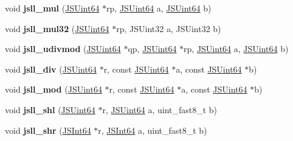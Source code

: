 \begin{DoxyCompactItemize}
\item 
\mbox{\label{group__zcl__64_ga09e45168abb5ea8e6d487514eae102c8}} 
void {\bfseries jsll\+\_\+mul} (\hyperlink{struct_j_s_int64}{J\+S\+Uint64} $\ast$rp, \hyperlink{struct_j_s_int64}{J\+S\+Uint64} a, \hyperlink{struct_j_s_int64}{J\+S\+Uint64} b)
\item 
\mbox{\label{group__zcl__64_ga0b4ed4198b603054301a4c9147e5f060}} 
void {\bfseries jsll\+\_\+mul32} (\hyperlink{struct_j_s_int64}{J\+S\+Uint64} $\ast$rp, J\+S\+Uint32 a, J\+S\+Uint32 b)
\item 
\mbox{\label{group__zcl__64_ga26cb84da9083907cc41db0edf95b1b96}} 
void {\bfseries jsll\+\_\+udivmod} (\hyperlink{struct_j_s_int64}{J\+S\+Uint64} $\ast$qp, \hyperlink{struct_j_s_int64}{J\+S\+Uint64} $\ast$rp, \hyperlink{struct_j_s_int64}{J\+S\+Uint64} a, \hyperlink{struct_j_s_int64}{J\+S\+Uint64} b)
\item 
\mbox{\label{group__zcl__64_gaf40c23a4a3872380497dae260ea58554}} 
void {\bfseries jsll\+\_\+div} (\hyperlink{struct_j_s_int64}{J\+S\+Uint64} $\ast$r, const \hyperlink{struct_j_s_int64}{J\+S\+Uint64} $\ast$a, const \hyperlink{struct_j_s_int64}{J\+S\+Uint64} $\ast$b)
\item 
\mbox{\label{group__zcl__64_gaecddfb7e3ca39fa5313632c47a47f20c}} 
void {\bfseries jsll\+\_\+mod} (\hyperlink{struct_j_s_int64}{J\+S\+Uint64} $\ast$r, const \hyperlink{struct_j_s_int64}{J\+S\+Uint64} $\ast$a, const \hyperlink{struct_j_s_int64}{J\+S\+Uint64} $\ast$b)
\item 
\mbox{\label{group__zcl__64_gadbc8463d4ec9862cbb621cdd5f7297fa}} 
void {\bfseries jsll\+\_\+shl} (\hyperlink{struct_j_s_int64}{J\+S\+Uint64} $\ast$r, \hyperlink{struct_j_s_int64}{J\+S\+Uint64} a, uint\+\_\+fast8\+\_\+t b)
\item 
\mbox{\label{group__zcl__64_gab406a00beab4086e1f29bfa6c98e0e6d}} 
void {\bfseries jsll\+\_\+shr} (\hyperlink{struct_j_s_int64}{J\+S\+Int64} $\ast$r, \hyperlink{struct_j_s_int64}{J\+S\+Int64} a, uint\+\_\+fast8\+\_\+t b)
\item 
\mbox{\label{group__zcl__64_gaab6291a66e18f75aa28dd777cb66d49b}} 

\end{DoxyCompactItemize}
